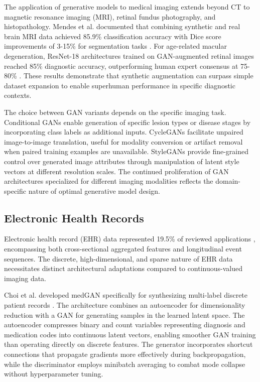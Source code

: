 The application of generative models to medical imaging extends beyond CT to magnetic resonance imaging (MRI), retinal fundus photography, and histopathology. Mendes et al. documented that combining synthetic and real brain MRI data achieved 85.9\% classification accuracy with Dice score improvements of 3-15\% for segmentation tasks \cite{mendes2025synthetic}. For age-related macular degeneration, ResNet-18 architectures trained on GAN-augmented retinal images reached 85\% diagnostic accuracy, outperforming human expert consensus at 75-80\% \cite{mendes2025synthetic}. These results demonstrate that synthetic augmentation can surpass simple dataset expansion to enable superhuman performance in specific diagnostic contexts.

The choice between GAN variants depends on the specific imaging task. Conditional GANs enable generation of specific lesion types or disease stages by incorporating class labels as additional inputs. CycleGANs facilitate unpaired image-to-image translation, useful for modality conversion or artifact removal when paired training examples are unavailable. StyleGANs provide fine-grained control over generated image attributes through manipulation of latent style vectors at different resolution scales. The continued proliferation of GAN architectures specialized for different imaging modalities reflects the domain-specific nature of optimal generative model design.

\subsection{Electronic Health Records}

Electronic health record (EHR) data represented 19.5\% of reviewed applications \cite{finetti2025data}, encompassing both cross-sectional aggregated features and longitudinal event sequences. The discrete, high-dimensional, and sparse nature of EHR data necessitates distinct architectural adaptations compared to continuous-valued imaging data.

Choi et al. developed medGAN specifically for synthesizing multi-label discrete patient records \cite{choi2017generating}. The architecture combines an autoencoder for dimensionality reduction with a GAN for generating samples in the learned latent space. The autoencoder compresses binary and count variables representing diagnosis and medication codes into continuous latent vectors, enabling smoother GAN training than operating directly on discrete features. The generator incorporates shortcut connections that propagate gradients more effectively during backpropagation, while the discriminator employs minibatch averaging to combat mode collapse without hyperparameter tuning.

